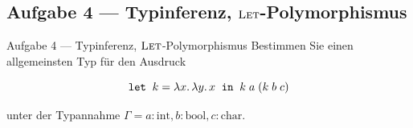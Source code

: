 \documentclass{beamer}
\begin{document}
\subsection{Aufgabe 4 --- Typinferenz, $\textsc{Let}$-Polymorphismus}

\begin{frame}{Aufgabe 4 --- Typinferenz, $\textsc{Let}$-Polymorphismus}
  Bestimmen Sie einen allgemeinsten Typ für den Ausdruck

  \begin{equation*}
    \texttt{let} \;\; k = \lambda x.\, \lambda y.\, x \;\; \texttt{in} \;\; k\;a\;(k\;b\;c)
  \end{equation*}

  unter der Typannahme $\Gamma = a : \text{int}, b : \text{bool}, c : \text{char}$.
\end{frame}
\end{document}
